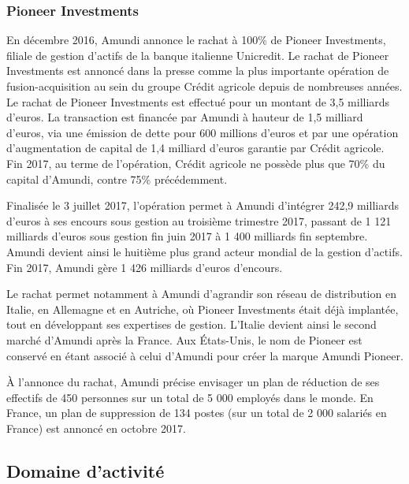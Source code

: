 \subsubsection{Pioneer Investments}
\par En décembre 2016, Amundi annonce le rachat à 100\% de Pioneer Investments, filiale de gestion d'actifs de la banque italienne Unicredit. Le rachat de Pioneer Investments est annoncé dans la presse comme la plus importante opération de fusion-acquisition au sein du groupe Crédit agricole depuis de nombreuses années. Le rachat de Pioneer Investments est effectué pour un montant de 3,5 milliards d'euros. La transaction est financée par Amundi à hauteur de 1,5 milliard d'euros, via une émission de dette pour 600 millions d'euros et par une opération d'augmentation de capital de 1,4 milliard d'euros garantie par Crédit agricole. Fin 2017, au terme de l'opération, Crédit agricole ne possède plus que 70\% du capital d'Amundi, contre 75\% précédemment.
\par Finalisée le 3 juillet 2017, l'opération permet à Amundi d'intégrer 242,9 milliards d'euros à ses encours sous gestion au troisième trimestre 2017, passant de 1 121 milliards d'euros sous gestion fin juin 2017 à 1 400 milliards fin septembre. Amundi devient ainsi le huitième plus grand acteur mondial de la gestion d'actifs. Fin 2017, Amundi gère 1 426 milliards d'euros d'encours.
\par Le rachat permet notamment à Amundi d'agrandir son réseau de distribution en Italie, en Allemagne et en Autriche, où Pioneer Investments était déjà implantée, tout en développant ses expertises de gestion. L'Italie devient ainsi le second marché d'Amundi après la France. Aux États-Unis, le nom de Pioneer est conservé en étant associé à celui d'Amundi pour créer la marque Amundi Pioneer.
\par À l'annonce du rachat, Amundi précise envisager un plan de réduction de ses effectifs de 450 personnes sur un total de 5 000 employés dans le monde. En France, un plan de suppression de 134 postes (sur un total de 2 000 salariés en France) est annoncé en octobre 2017.

\subsection{Domaine d'activité}
